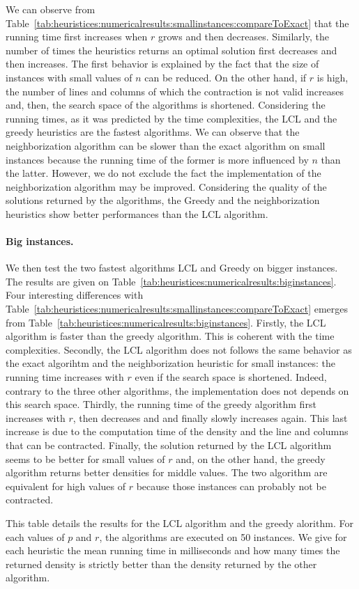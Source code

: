 We can observe from Table~\ref{tab:heuristices:numericalresults:smallinstances:compareToExact} that the running time first increases when $r$ grows and then decreases. Similarly, the number of times the heuristics returns an optimal solution first decreases and then increases. The first behavior is explained by the fact that the size of instances with small values of $n$ can be reduced. On the other hand, if $r$ is high, the number of lines and columns of which the contraction is not valid increases and, then, the search space of the algorithms is shortened. Considering the running times, as it was predicted by the time complexities, the LCL and the greedy heuristics are the fastest algorithms. We can observe that the neighborization algorithm can be slower than the exact algorithm on small instances because the running time of the former is more influenced by $n$ than the latter. However, we do not exclude the fact the implementation of the neighborization algorithm may be improved. Considering the quality of the solutions returned by the algorithms, the Greedy and the neighborization heuristics show better performances than the LCL algorithm.

\paragraph{Big instances. }
We then test the two fastest algorithms LCL and Greedy on bigger instances. The results are given on Table~\ref{tab:heuristices:numericalresults:biginstances}.  Four interesting differences with Table~\ref{tab:heuristices:numericalresults:smallinstances:compareToExact} emerges from Table~\ref{tab:heuristices:numericalresults:biginstances}. Firstly, the LCL algorithm is faster than the greedy algorithm. This is coherent with the time complexities. Secondly, the LCL algorithm does not follows the same behavior as the exact algorihtm and the neighborization heuristic for small instances: the running time increases with $r$ even if the search space is shortened. Indeed, contrary to the three other algorithms, the implementation does not depends on this search space. Thirdly, the running time of the greedy algorithm first increases with $r$, then decreases and and finally slowly increases again. This last increase is due to the computation time of the density and the line and columns that can be contracted.  Finally, the solution returned by the LCL algorithm seems to be better for small values of $r$ and, on the other hand, the greedy algorithm returns better densities for middle values. The two algorithm are equivalent for high values of $r$ because those instances can probably not be contracted.

\begin{table}[ht!]
	\centering
	\def\arraystretch{1.2}
	\setlength\tabcolsep{0.05cm}
	\scriptsize
	
	\caption{This table details the results for the LCL algorithm and the greedy alorithm. For each values of $p$ and $r$, the algorithms are executed on 50 instances. We give for each heuristic the mean running time in milliseconds and how many times the returned density is strictly better than the density returned by the other algorithm.}
	\label{tab:heuristices:numericalresults:biginstances}
\end{table}
